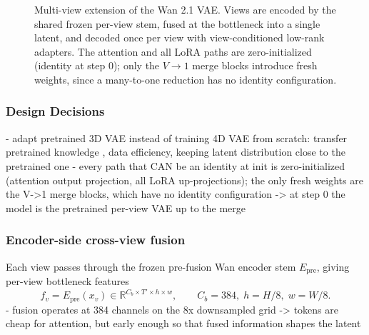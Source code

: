 \begin{figure}[t]
\centering
{}
\caption{Multi-view extension of the Wan 2.1 VAE. Views are encoded by the shared frozen per-view stem, fused at the bottleneck into a single latent, and decoded once per view with view-conditioned low-rank adapters. The attention and all LoRA paths are zero-initialized (identity at step 0); only the $V{\to}1$ merge blocks introduce fresh weights, since a many-to-one reduction has no identity configuration.}
\label{fig:overview}
\end{figure}

\subsubsection{Design Decisions}

- adapt pretrained 3D VAE instead of training 4D VAE from scratch: transfer pretrained knowledge \cite{carreira2017quo, blattmann2023align}, data efficiency, keeping latent distribution close to the pretrained one
- every path that CAN be an identity at init is zero-initialized (attention output projection, all LoRA up-projections); the only fresh weights are the V->1 merge blocks, which have no identity configuration -> at step 0 the model is the pretrained per-view VAE up to the merge

\subsubsection{Encoder-side cross-view fusion}

Each view passes through the frozen pre-fusion Wan encoder stem $E_{\mathrm{pre}}$, giving per-view bottleneck features
\begin{equation}
f_v = E_{\mathrm{pre}}(x_v) \in \mathbb{R}^{C_b \times T' \times h \times w},
\qquad C_b = 384,\; h = H/8,\; w = W/8 .
\end{equation}
- fusion operates at 384 channels on the 8x downsampled grid -> tokens are cheap for attention, but early enough so that fused information shapes the latent

